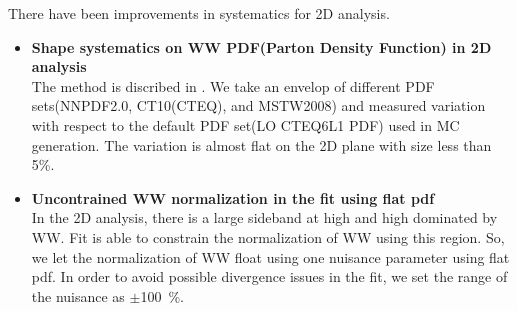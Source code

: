 There have been improvements in systematics for 2D analysis.

\begin{itemize}
    \item \textbf{Shape systematics on WW PDF(Parton Density Function) in 2D analysis}  \\
        The method is discribed in \cite{AcceptUncert}. We take an envelop of different 
        PDF sets(NNPDF2.0, CT10(CTEQ), and MSTW2008) and measured variation with respect 
        to the default PDF set(LO CTEQ6L1 PDF) used in MC generation. The variation is 
        almost flat on the 2D plane with size less than 5\%.
    \item \textbf{Uncontrained WW normalization in the fit using flat pdf}  \\   
        In the 2D analysis, there is a large sideband at high \mt and high \mll 
        dominated by WW. Fit is able to constrain the normalization of WW using this region. 
        So, we let the normalization of WW float using one nuisance parameter using flat pdf. 
        In order to avoid possible divergence issues in the fit, we set the range 
        of the nuisance as $\pm$100~\%. 
\end{itemize}



